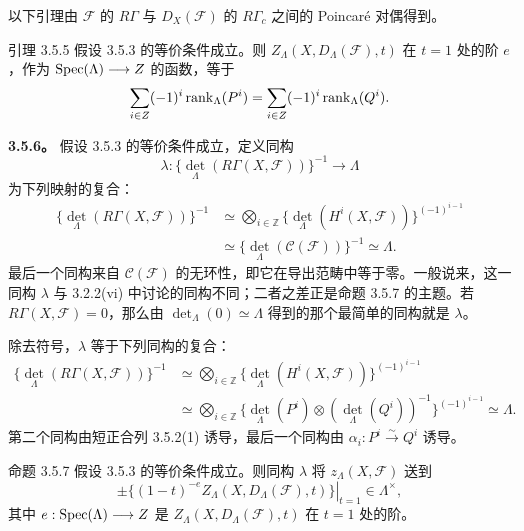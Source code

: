 以下引理由 $\mathcal F$ 的 $R\Gamma$ 与 $D_X(\mathcal F)$ 的 $R\Gamma_c$ 之间的 Poincaré 对偶得到。
\begin{statement}{引理 3.5.5}
假设 3.5.3 的等价条件成立。则 $Z_\Lambda(X,D_\Lambda(\mathcal F),t)$ 在 $t=1$ 处的阶 $e$，作为 $\operatorname{Spec}(\Lambda)\longrightarrow Z$ 的函数，等于
\[
 \sum_{i\in Z}(-1)^i\operatorname{rank}_\Lambda(P^i)=\sum_{i\in Z}(-1)^i\operatorname{rank}_\Lambda(Q^i).
\]
\end{statement}
\textbf{3.5.6。} 假设 3.5.3 的等价条件成立，定义同构
\[
 \lambda:\{\det_\Lambda(R\Gamma(X,\mathcal F))\}^{-1}\longrightarrow\Lambda
\]
为下列映射的复合：
\begin{align*}
 \{\det_\Lambda(R\Gamma(X,\mathcal F))\}^{-1}
 &\simeq\bigotimes_{i\in\mathbb Z}\{\det_\Lambda(H^i(X,\mathcal F))\}^{(-1)^{i-1}}\\
 &\simeq\{\det_\Lambda(\mathcal C(\mathcal F))\}^{-1}\simeq\Lambda.
\end{align*}
最后一个同构来自 $\mathcal C(\mathcal F)$ 的无环性，即它在导出范畴中等于零。一般说来，这一同构 $\lambda$ 与 3.2.2(vi) 中讨论的同构不同；二者之差正是命题 3.5.7 的主题。若 $R\Gamma(X,\mathcal F)=0$，那么由 $\det_\Lambda(0)\simeq\Lambda$ 得到的那个最简单的同构就是 $\lambda$。

除去符号，$\lambda$ 等于下列同构的复合：
\begin{align*}
 \{\det_\Lambda(R\Gamma(X,\mathcal F))\}^{-1}
 &\simeq\bigotimes_{i\in\mathbb Z}\{\det_\Lambda(H^i(X,\mathcal F))\}^{(-1)^{i-1}}\\
 &\simeq\bigotimes_{i\in\mathbb Z}\{\det_\Lambda(P^i)\otimes(\det_\Lambda(Q^i))^{-1}\}^{(-1)^{i-1}}
 \simeq\Lambda.
\end{align*}
第二个同构由短正合列 3.5.2(1) 诱导，最后一个同构由 $\alpha_i:P^i\xrightarrow{\sim}Q^i$ 诱导。
\begin{statement}{命题 3.5.7}
假设 3.5.3 的等价条件成立。则同构 $\lambda$ 将 $z_\Lambda(X,\mathcal F)$ 送到
\[
 \pm\left.\{(1-t)^{-e}Z_\Lambda(X,D_\Lambda(\mathcal F),t)\}\right|_{t=1}\in\Lambda^\times,
\]
其中 $e:\operatorname{Spec}(\Lambda)\longrightarrow Z$ 是 $Z_\Lambda(X,D_\Lambda(\mathcal F),t)$ 在 $t=1$ 处的阶。
\end{statement}

